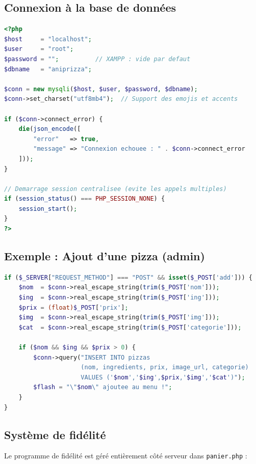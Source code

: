 \documentclass[a4paper,12pt]{article}
\begin{document}
\subsection{Connexion à la base de données}

\begin{lstlisting}[language=PHP, caption=config.php — Connexion centralisée]
<?php
$host     = "localhost";
$user     = "root";
$password = "";          // XAMPP : vide par defaut
$dbname   = "aniprizza";

$conn = new mysqli($host, $user, $password, $dbname);
$conn->set_charset("utf8mb4");  // Support des emojis et accents

if ($conn->connect_error) {
    die(json_encode([
        "error"   => true,
        "message" => "Connexion echouee : " . $conn->connect_error
    ]));
}

// Demarrage session centralisee (evite les appels multiples)
if (session_status() === PHP_SESSION_NONE) {
    session_start();
}
?>
\end{lstlisting}

\subsection{Exemple : Ajout d'une pizza (admin)}

\begin{lstlisting}[language=PHP, caption=admin\_pizzas.php — Ajout d'une pizza (extrait)]
if ($_SERVER["REQUEST_METHOD"] === "POST" && isset($_POST['add'])) {
    $nom  = $conn->real_escape_string(trim($_POST['nom']));
    $ing  = $conn->real_escape_string(trim($_POST['ing']));
    $prix = (float)$_POST['prix'];
    $img  = $conn->real_escape_string(trim($_POST['img']));
    $cat  = $conn->real_escape_string(trim($_POST['categorie']));

    if ($nom && $ing && $prix > 0) {
        $conn->query("INSERT INTO pizzas 
                     (nom, ingredients, prix, image_url, categorie)
                     VALUES ('$nom','$ing',$prix,'$img','$cat')");
        $flash = "\"$nom\" ajoutee au menu !";
    }
}
\end{lstlisting}

\subsection{Système de fidélité}

Le programme de fidélité est géré entièrement côté serveur dans \texttt{panier.php} :
\end{document}
